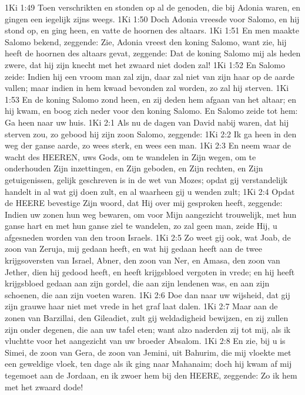 1Ki 1:49  Toen verschrikten en stonden op al de genoden, die bij Adonia waren, en gingen een iegelijk zijns weegs.
1Ki 1:50  Doch Adonia vreesde voor Salomo, en hij stond op, en ging heen, en vatte de hoornen des altaars.
1Ki 1:51  En men maakte Salomo bekend, zeggende: Zie, Adonia vreest den koning Salomo, want zie, hij heeft de hoornen des altaars gevat, zeggende: Dat de koning Salomo mij als heden zwere, dat hij zijn knecht met het zwaard niet doden zal!
1Ki 1:52  En Salomo zeide: Indien hij een vroom man zal zijn, daar zal niet van zijn haar op de aarde vallen; maar indien in hem kwaad bevonden zal worden, zo zal hij sterven.
1Ki 1:53  En de koning Salomo zond heen, en zij deden hem afgaan van het altaar; en hij kwam, en boog zich neder voor den koning Salomo. En Salomo zeide tot hem: Ga heen naar uw huis.
1Ki 2:1  Als nu de dagen van David nabij waren, dat hij sterven zou, zo gebood hij zijn zoon Salomo, zeggende:
1Ki 2:2  Ik ga heen in den weg der ganse aarde, zo wees sterk, en wees een man.
1Ki 2:3  En neem waar de wacht des HEEREN, uws Gods, om te wandelen in Zijn wegen, om te onderhouden Zijn inzettingen, en Zijn geboden, en Zijn rechten, en Zijn getuigenissen, gelijk geschreven is in de wet van Mozes; opdat gij verstandelijk handelt in al wat gij doen zult, en al waarheen gij u wenden zult;
1Ki 2:4  Opdat de HEERE bevestige Zijn woord, dat Hij over mij gesproken heeft, zeggende: Indien uw zonen hun weg bewaren, om voor Mijn aangezicht trouwelijk, met hun ganse hart en met hun ganse ziel te wandelen, zo zal geen man, zeide Hij, u afgesneden worden van den troon Israels.
1Ki 2:5  Zo weet gij ook, wat Joab, de zoon van Zeruja, mij gedaan heeft, en wat hij gedaan heeft aan de twee krijgsoversten van Israel, Abner, den zoon van Ner, en Amasa, den zoon van Jether, dien hij gedood heeft, en heeft krijgsbloed vergoten in vrede; en hij heeft krijgsbloed gedaan aan zijn gordel, die aan zijn lendenen was, en aan zijn schoenen, die aan zijn voeten waren.
1Ki 2:6  Doe dan naar uw wijsheid, dat gij zijn grauwe haar niet met vrede in het graf laat dalen.
1Ki 2:7  Maar aan de zonen van Barzillai, den Gileadiet, zult gij weldadigheid bewijzen, en zij zullen zijn onder degenen, die aan uw tafel eten; want alzo naderden zij tot mij, als ik vluchtte voor het aangezicht van uw broeder Absalom.
1Ki 2:8  En zie, bij u is Simei, de zoon van Gera, de zoon van Jemini, uit Bahurim, die mij vloekte met een geweldige vloek, ten dage als ik ging naar Mahanaim; doch hij kwam af mij tegemoet aan de Jordaan, en ik zwoer hem bij den HEERE, zeggende: Zo ik hem met het zwaard dode!
